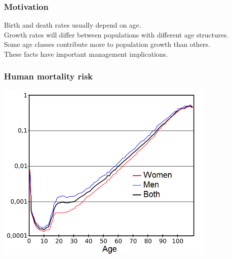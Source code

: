 \documentclass[color=usenames,dvipsnames]{beamer}\usepackage[]{graphicx}\usepackage[]{color}
\begin{document}
\begin{frame}
  \frametitle{Motivation}
  \large
  Birth and death rates usually depend on age. \\
  \pause
  \vfill
  Growth rates will differ between populations with
  different age structures. \\
  \pause
  \vfill
  Some age classes contribute more to population growth than others. \\
  \pause
  \vfill
  These facts have important management implications. \\
\end{frame}




\begin{frame}
  \frametitle{Human mortality risk}
  \centering
  \includegraphics[width=0.8\textwidth]{figs/Mortality_by_age} \\
\end{frame}
\end{document}
